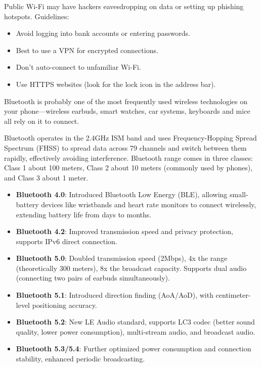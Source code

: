 
Public Wi-Fi may have hackers eavesdropping on data or setting up phishing hotspots. Guidelines:

\begin{itemize}
  \item Avoid logging into bank accounts or entering passwords.
  \item Best to use a VPN for encrypted connections.
  \item Don't auto-connect to unfamiliar Wi-Fi.
  \item Use HTTPS websites (look for the lock icon in the address bar).
\end{itemize}


Bluetooth is probably one of the most frequently used wireless technologies on your phone—wireless earbuds, smart watches, car systems, keyboards and mice all rely on it to connect.


Bluetooth operates in the 2.4GHz ISM band and uses Frequency-Hopping Spread Spectrum (FHSS) to spread data across 79 channels and switch between them rapidly, effectively avoiding interference. Bluetooth range comes in three classes: Class 1 about 100 meters, Class 2 about 10 meters (commonly used by phones), and Class 3 about 1 meter.


\begin{itemize}
  \item \textbf{Bluetooth 4.0}: Introduced Bluetooth Low Energy (BLE), allowing small-battery devices like wristbands and heart rate monitors to connect wirelessly, extending battery life from days to months.
  \item \textbf{Bluetooth 4.2}: Improved transmission speed and privacy protection, supports IPv6 direct connection.
  \item \textbf{Bluetooth 5.0}: Doubled transmission speed (2Mbps), 4x the range (theoretically 300 meters), 8x the broadcast capacity. Supports dual audio (connecting two pairs of earbuds simultaneously).
  \item \textbf{Bluetooth 5.1}: Introduced direction finding (AoA/AoD), with centimeter-level positioning accuracy.
  \item \textbf{Bluetooth 5.2}: New LE Audio standard, supports LC3 codec (better sound quality, lower power consumption), multi-stream audio, and broadcast audio.
  \item \textbf{Bluetooth 5.3/5.4}: Further optimized power consumption and connection stability, enhanced periodic broadcasting.
\end{itemize}

